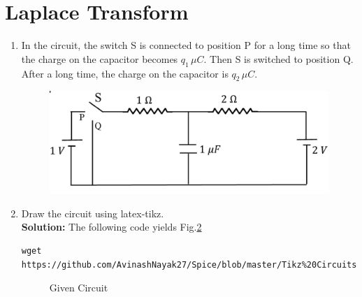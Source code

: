 \documentclass[journal,12pt,twocolumn]{IEEEtran}
\newcommand{\solution}{\noindent \textbf{Solution: }}
\numberwithin{equation}{section}
\renewcommand\thesection{\arabic{section}}
\begin{document}
 \section{Laplace Transform}
\begin{enumerate}[label=\arabic*.,ref=\thesection.\theenumi]
\item In the circuit, the switch S is connected to position P for a long time so that the charge on the capacitor
	becomes $q_1 \, \mu C$. Then S is switched to position Q.  After a long time, the charge on the capacitor is
		$q_2 \, \mu C$.
		\begin{figure}[!ht]
			\centering
			\includegraphics[width=\columnwidth]{figs/ckt.jpg}
			\caption{}
			\label{fig:ckt}
\end{figure}
\item Draw the circuit using latex-tikz.\\
\solution The following code yields Fig.\ref{fig:qn}
\begin{lstlisting}
wget https://github.com/AvinashNayak27/Spice/blob/master/Tikz%20Circuits/2.2.tex
\end{lstlisting}
\begin{figure}[!ht]
 \centering
  
\caption{Given Circuit}
\label{fig:qn}
\end{figure}


\end{enumerate}
\end{document}
